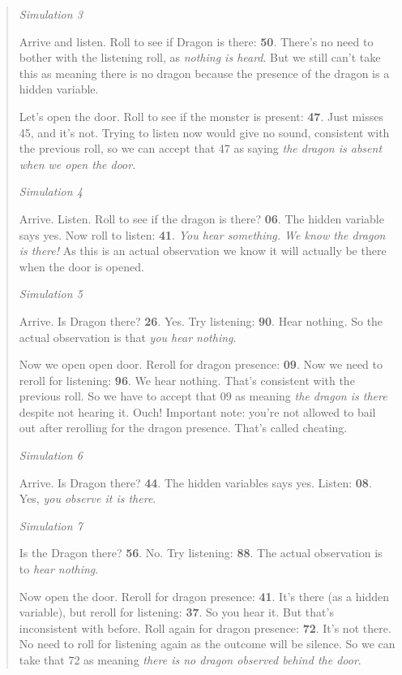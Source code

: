 \documentclass[12pt]{article}
\begin{document}
\begin{quote}
\emph{Simulation 3}

Arrive and listen. Roll to see if Dragon is there: \textbf{50}. There's
no need to bother with the listening roll, as \emph{nothing is heard}.
But we still can't take this as meaning there is no dragon because
the presence of the dragon is a hidden variable.

Let's open the door. Roll to see if the monster is present:
\textbf{47}. Just misses 45, and it's not. Trying to listen now
would give no sound, consistent with the previous roll, so we can accept
that 47 as saying \emph{the dragon is absent when we open the door}.

\hrulefill

\emph{Simulation 4}

Arrive. Listen. Roll to see if the dragon is there? \textbf{06}. The
hidden variable says yes. Now roll to listen: \textbf{41}. \emph{You
hear something. We know the dragon is there!} As this is an actual
observation we know it will actually be there when the door is opened.

\hrulefill

\emph{Simulation 5}

Arrive. Is Dragon there? \textbf{26}. Yes. Try listening: \textbf{90}.
Hear nothing\emph{.} So the actual observation is that \emph{you hear
nothing}.

Now we open open door. Reroll for dragon presence: \textbf{09}. Now we
need to reroll for listening: \textbf{96}. We hear nothing. That's
consistent with the previous roll. So we have to accept that 09 as
meaning \emph{the dragon is there} despite not hearing it. Ouch!
Important note: you're not allowed to bail out after rerolling for
the dragon presence.
That's called cheating.

\hrulefill

\emph{Simulation 6}

Arrive. Is Dragon there? \textbf{44}. The hidden variables says yes.
Listen: \textbf{08}. Yes, \emph{you observe it is there}.

\hrulefill

\emph{Simulation 7}

Is the Dragon there? \textbf{56}. No. Try listening: \textbf{88}. The
actual observation is to \emph{hear nothing}.

Now open the door. Reroll for dragon presence: \textbf{41}. It's
there (as a hidden variable), but reroll for listening: \textbf{37}. So
you hear it. But that's inconsistent with before. Roll again for
dragon presence: \textbf{72}. It's not there. No need to roll for
listening again as the outcome will be silence. So we can take that 72
as meaning \emph{there is no dragon observed behind the door}.
\end{quote}
\end{document}
